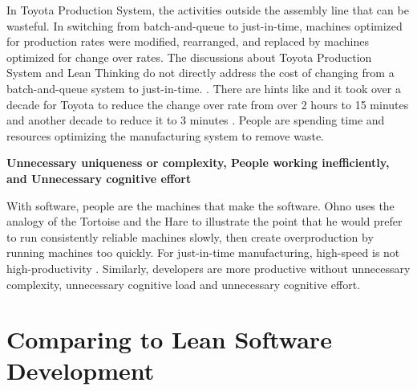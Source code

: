 In Toyota Production System, the activities outside the assembly line that can be wasteful. In switching from batch-and-queue to just-in-time, machines optimized for production rates were modified, rearranged, and replaced by machines optimized for change over rates. The discussions about Toyota Production System and Lean Thinking do not directly address the cost of changing from a batch-and-queue system to just-in-time. \cite{OhnoToyotaProductionSystem, WomackLeanThinking}. There are hints like  and it took over a decade for Toyota to reduce the change over rate from over 2 hours to 15 minutes and another decade to reduce it to 3 minutes \cite{OhnoToyotaProductionSystem}. People are spending time and resources optimizing the manufacturing system to remove waste. 

\textbf{Unnecessary uniqueness or complexity, People working inefficiently, and Unnecessary cognitive effort}

With software, people are the machines that make the software. Ohno uses the analogy of the Tortoise and the Hare to illustrate the point that he would prefer to run consistently reliable machines slowly, then create overproduction by running machines too quickly. For just-in-time manufacturing,  high-speed is not high-productivity \cite{OhnoToyotaProductionSystem}.  Similarly, developers are more productive without unnecessary complexity, unnecessary cognitive load and unnecessary cognitive effort.
\section{Comparing to Lean Software Development}

